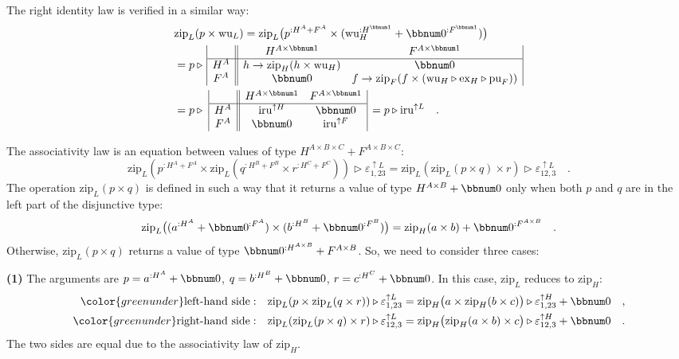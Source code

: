 The right identity law is verified in a similar way:
\begin{align*}
 & \text{zip}_{L}(p\times\text{wu}_{L})=\text{zip}_{L}\big(p^{:H^{A}+F^{A}}\times(\text{wu}_{H}^{:H^{\bbnum 1}}+\bbnum 0^{:F^{\bbnum 1}})\big)\\
 & =p\triangleright\,\begin{array}{|c||cc|}
 & H^{A\times\bbnum 1} & F^{A\times\bbnum 1}\\
\hline H^{A} & h\rightarrow\text{zip}_{H}(h\times\text{wu}_{H}) & \bbnum 0\\
F^{A} & \bbnum 0 & f\rightarrow\text{zip}_{F}(f\times(\text{wu}_{H}\triangleright\text{ex}_{H}\triangleright\text{pu}_{F}))
\end{array}\\
 & =p\triangleright\,\,\begin{array}{|c||cc|}
 & H^{A\times\bbnum 1} & F^{A\times\bbnum 1}\\
\hline H^{A} & \text{iru}^{\uparrow H} & \bbnum 0\\
F^{A} & \bbnum 0 & \text{iru}^{\uparrow F}
\end{array}\,=p\triangleright\text{iru}^{\uparrow L}\quad.
\end{align*}

The associativity law is an equation between values of type $H^{A\times B\times C}+F^{A\times B\times C}$:
\[
\text{zip}_{L}(p^{:H^{A}+F^{A}}\times\text{zip}_{L}(q^{:H^{B}+F^{B}}\times r^{:H^{C}+F^{C}}))\triangleright\varepsilon_{1,23}^{\uparrow L}=\text{zip}_{L}(\text{zip}_{L}(p\times q)\times r)\triangleright\varepsilon_{12,3}^{\uparrow L}\quad.
\]
The operation $\text{zip}_{L}(p\times q)$ is defined in such a way
that it returns a value of type $H^{A\times B}+\bbnum 0$ only when
both $p$ and $q$ are in the left part of the disjunctive type:
\[
\text{zip}_{L}\big((a^{:H^{A}}+\bbnum 0^{:F^{A}})\times(b^{:H^{B}}+\bbnum 0^{:F^{B}})\big)=\text{zip}_{H}(a\times b)+\bbnum 0^{:F^{A\times B}}\quad.
\]
Otherwise, $\text{zip}_{L}(p\times q)$ returns a value of type $\bbnum 0^{:H^{A\times B}}+F^{A\times B}$.
So, we need to consider three cases:

\textbf{(1)} The arguments are $p=a^{:H^{A}}+\bbnum 0$, $q=b^{:H^{B}}+\bbnum 0$,
$r=c^{:H^{C}}+\bbnum 0$. In this case, $\text{zip}_{L}$ reduces
to $\text{zip}_{H}$:
\begin{align*}
{\color{greenunder}\text{left-hand side}:}\quad & \text{zip}_{L}(p\times\text{zip}_{L}(q\times r))\triangleright\varepsilon_{1,23}^{\uparrow L}=\text{zip}_{H}\big(a\times\text{zip}_{H}(b\times c)\big)\triangleright\varepsilon_{1,23}^{\uparrow H}+\bbnum 0\quad,\\
{\color{greenunder}\text{right-hand side}:}\quad & \text{zip}_{L}(\text{zip}_{L}(p\times q)\times r)\triangleright\varepsilon_{12,3}^{\uparrow L}=\text{zip}_{H}\big(\text{zip}_{H}(a\times b)\times c\big)\triangleright\varepsilon_{12,3}^{\uparrow H}+\bbnum 0\quad.
\end{align*}
The two sides are equal due to the associativity law of $\text{zip}_{H}$.


